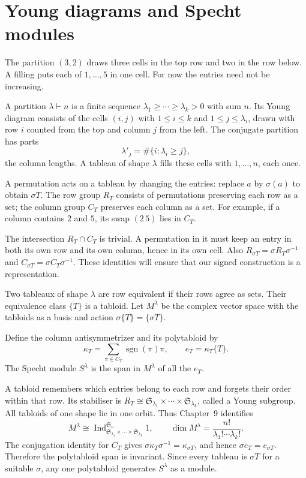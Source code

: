 \section{Young diagrams and Specht modules}

The partition $(3,2)$ draws three cells in the top row and two in the row below. A filling puts each of $1,\ldots,5$ in one cell. For now the entries need not be increasing.

\begin{definition}\label{def:partition}
A partition $\lambda\vdash n$ is a finite sequence
$\lambda_1\ge\cdots\ge\lambda_k>0$ with sum $n$.
Its Young diagram consists of the cells $(i,j)$ with $1\le i\le k$ and $1\le j\le\lambda_i$, drawn with row $i$ counted from the top and column $j$ from the left. The conjugate partition has parts
\[
\lambda'_j=\#\{i:\lambda_i\ge j\},
\]
the column lengths. A tableau of shape $\lambda$ fills these cells with $1,\ldots,n$, each once.
\end{definition}

A permutation acts on a tableau by changing the entries: replace $a$ by $\sigma(a)$ to obtain $\sigma T$. The row group $R_T$ consists of permutations preserving each row as a set; the column group $C_T$ preserves each column as a set. For example, if a column contains $2$ and $5$, its swap $(2\,5)$ lies in $C_T$.

The intersection $R_T\cap C_T$ is trivial. A permutation in it must keep an entry in both its own row and its own column, hence in its own cell. Also
$R_{\sigma T}=\sigma R_T\sigma^{-1}$ and
$C_{\sigma T}=\sigma C_T\sigma^{-1}$.
These identities will ensure that our signed construction is a representation.

\begin{definition}\label{def:tabloid}
Two tableaux of shape $\lambda$ are row equivalent if their rows agree as sets. Their equivalence class $\{T\}$ is a tabloid. Let $M^\lambda$ be the complex vector space with the tabloids as a basis and action $\sigma\{T\}=\{\sigma T\}$.

Define the column antisymmetrizer and its polytabloid by
\[
\kappa_T=\sum_{\pi\in C_T}\operatorname{sgn}(\pi)\pi,
\qquad e_T=\kappa_T\{T\}.
\]
The Specht module $S^\lambda$ is the span in $M^\lambda$ of all the $e_T$.
\end{definition}

A tabloid remembers which entries belong to each row and forgets their order within that row. Its stabiliser is
$R_T\cong\mathfrak S_{\lambda_1}\times\cdots\times\mathfrak S_{\lambda_k}$,
called a Young subgroup. All tabloids of one shape lie in one orbit. Thus Chapter~9 identifies
\[
M^\lambda\cong
\operatorname{Ind}_{\mathfrak S_{\lambda_1}\times\cdots\times\mathfrak S_{\lambda_k}}^{\mathfrak S_n}1,
\qquad \dim M^\lambda=\frac{n!}{\lambda_1!\cdots\lambda_k!}.
\]
The conjugation identity for $C_T$ gives $\sigma\kappa_T\sigma^{-1}=\kappa_{\sigma T}$, and hence $\sigma e_T=e_{\sigma T}$. Therefore the polytabloid span is invariant. Since every tableau is $\sigma T$ for a suitable $\sigma$, any one polytabloid generates $S^\lambda$ as a module.

